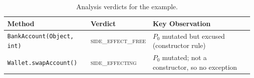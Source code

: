 \begin{table}[h]
\centering
\caption{Analysis verdicts for the example.}
\label{tab:example-summary}
\begin{tabular}{llll}
\toprule
\textbf{Method} & \textbf{Verdict} & \textbf{Key Observation} \\
\midrule
\texttt{BankAccount(Object, int)}  & \textsc{side\_effect\_free} & $P_0$ mutated but excused (constructor rule) \\
\texttt{Wallet.swapAccount()}      & \textsc{side\_effecting}    & $P_0$ mutated; not a constructor, so no exception \\
\bottomrule
\end{tabular}
\end{table}
